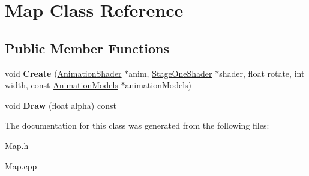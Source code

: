 \hypertarget{classMap}{\section{\-Map \-Class \-Reference}
\label{classMap}
}
\subsection*{\-Public \-Member \-Functions}
\begin{DoxyCompactItemize}
\item 
\hypertarget{classMap_a494ba521836d4e9b982a8a1535b93592}{void {\bfseries \-Create} (\hyperlink{classAnimationShader}{\-Animation\-Shader} $\ast$anim, \hyperlink{classStageOneShader}{\-Stage\-One\-Shader} $\ast$shader, float rotate, int width, const \hyperlink{classAnimationModels}{\-Animation\-Models} $\ast$animation\-Models)}\label{classMap_a494ba521836d4e9b982a8a1535b93592}

\item 
\hypertarget{classMap_aef97ae342e75418b3e803750d55ce3f5}{void {\bfseries \-Draw} (float alpha) const }\label{classMap_aef97ae342e75418b3e803750d55ce3f5}

\end{DoxyCompactItemize}


\-The documentation for this class was generated from the following files\-:\begin{DoxyCompactItemize}
\item 
\-Map.\-h\item 
\-Map.\-cpp\end{DoxyCompactItemize}
